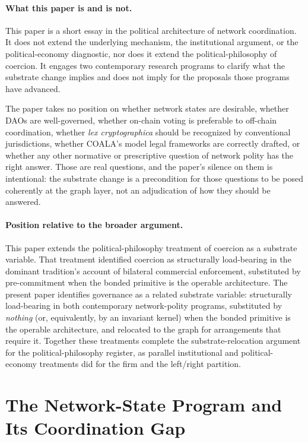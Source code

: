\documentclass[11pt,a4paper]{article}
\theoremstyle{remark}
\begin{document}
\paragraph{What this paper is and is not.}
This paper is a short essay in the political architecture of
network coordination. It does not extend the underlying
mechanism, the institutional argument, or the political-economy
diagnostic, nor does it extend the political-philosophy of
coercion. It engages two contemporary research
programs to clarify what the substrate change implies and does
not imply for the proposals those programs have advanced.

The paper takes no position on whether network states are
desirable, whether DAOs are well-governed, whether on-chain
voting is preferable to off-chain coordination, whether
\emph{lex cryptographica} should be recognized by conventional
jurisdictions, whether COALA's model legal frameworks are
correctly drafted, or whether any other normative or
prescriptive question of network polity has the right answer.
Those are real questions, and the paper's silence on them is
intentional: the substrate change is a precondition for those
questions to be posed coherently at the graph layer, not an
adjudication of how they should be answered.

\paragraph{Position relative to the broader argument.}
This paper extends the political-philosophy treatment of
coercion as a substrate variable. That treatment identified
coercion as structurally load-bearing in the dominant
tradition's account of bilateral commercial enforcement,
substituted by pre-commitment when the bonded primitive is the
operable architecture. The present paper identifies governance
as a related substrate variable: structurally load-bearing in
both contemporary network-polity programs, substituted by
\emph{nothing} (or, equivalently, by an invariant kernel) when
the bonded primitive is the operable architecture, and relocated
to the graph for arrangements that require it. Together these
treatments complete the substrate-relocation argument for the
political-philosophy register, as parallel institutional and
political-economy treatments did for the firm and the left/right
partition.

\section{The Network-State Program and Its Coordination Gap}
\label{sec:network-state}
\end{document}
